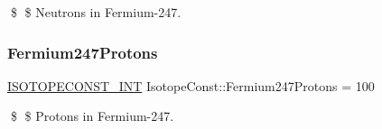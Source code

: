 \$ \$ Neutrons in Fermium-\/247. \mbox{\label{group___isotope_const-_fermium-_fm247_gabaaa0335b460009dff4a44428fd36ac4}} 
\subsubsection{\texorpdfstring{Fermium247\+Protons}{Fermium247Protons}}
{\footnotesize\ttfamily \mbox{\hyperlink{group___isotope_const-_macros_ga5f18360b3e99483a35c32d789e62621c}{I\+S\+O\+T\+O\+P\+E\+C\+O\+N\+S\+T\+\_\+\+I\+NT}} Isotope\+Const\+::\+Fermium247\+Protons = 100}

\$ \$ Protons in Fermium-\/247. 